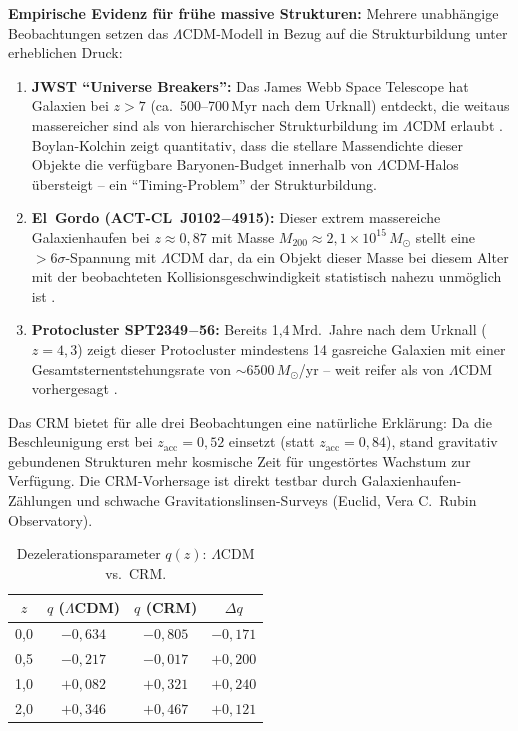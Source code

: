 \documentclass[aps,prd,twocolumn,superscriptaddress,nofootinbib]{revtex4-2}
\begin{document}
\textbf{Empirische Evidenz für frühe massive Strukturen:} Mehrere unabhängige Beobachtungen setzen das $\Lambda$CDM-Modell in Bezug auf die Strukturbildung unter erheblichen Druck:
\begin{enumerate}
\item \textbf{JWST ``Universe Breakers'':} Das James Webb Space Telescope hat Galaxien bei $z > 7$ (ca.\ 500--700\,Myr nach dem Urknall) entdeckt, die weitaus massereicher sind als von hierarchischer Strukturbildung im $\Lambda$CDM erlaubt \cite{Labbe2023}. Boylan-Kolchin \cite{BoylanKolchin2023} zeigt quantitativ, dass die stellare Massendichte dieser Objekte die verfügbare Baryonen-Budget innerhalb von $\Lambda$CDM-Halos übersteigt -- ein ``Timing-Problem'' der Strukturbildung.
\item \textbf{El~Gordo (ACT-CL~J0102$-$4915):} Dieser extrem massereiche Galaxienhaufen bei $z \approx 0{,}87$ mit Masse $M_{200} \approx 2{,}1 \times 10^{15}\,M_\odot$ stellt eine $> 6\sigma$-Spannung mit $\Lambda$CDM dar, da ein Objekt dieser Masse bei diesem Alter mit der beobachteten Kollisionsgeschwindigkeit statistisch nahezu unmöglich ist \cite{Asencio2023}.
\item \textbf{Protocluster SPT2349$-$56:} Bereits 1,4\,Mrd.\ Jahre nach dem Urknall ($z = 4{,}3$) zeigt dieser Protocluster mindestens 14 gasreiche Galaxien mit einer Gesamtsternentstehungsrate von $\sim\!6500\,M_\odot$/yr -- weit reifer als von $\Lambda$CDM vorhergesagt \cite{Miller2018}.
\end{enumerate}

Das CRM bietet für alle drei Beobachtungen eine natürliche Erklärung: Da die Beschleunigung erst bei $z_{\mathrm{acc}} = 0{,}52$ einsetzt (statt $z_{\mathrm{acc}} = 0{,}84$), stand gravitativ gebundenen Strukturen mehr kosmische Zeit für ungestörtes Wachstum zur Verfügung. Die CRM-Vorhersage ist direkt testbar durch Galaxienhaufen-Zählungen und schwache Gravitationslinsen-Surveys (Euclid, Vera C.\ Rubin Observatory).

\begin{table}[H]
\centering
\caption{Dezelerationsparameter $q(z)$: $\Lambda$CDM vs.\ CRM.}
\label{tab:qz}
\begin{tabular}{cccc}
\toprule
$z$ & $q$ ($\Lambda$CDM) & $q$ (CRM) & $\Delta q$ \\
\midrule
0,0 & $-0{,}634$ & $-0{,}805$ & $-0{,}171$ \\
0,5 & $-0{,}217$ & $-0{,}017$ & $+0{,}200$ \\
1,0 & $+0{,}082$ & $+0{,}321$ & $+0{,}240$ \\
2,0 & $+0{,}346$ & $+0{,}467$ & $+0{,}121$ \\
\bottomrule
\end{tabular}
\end{table}
\end{document}
